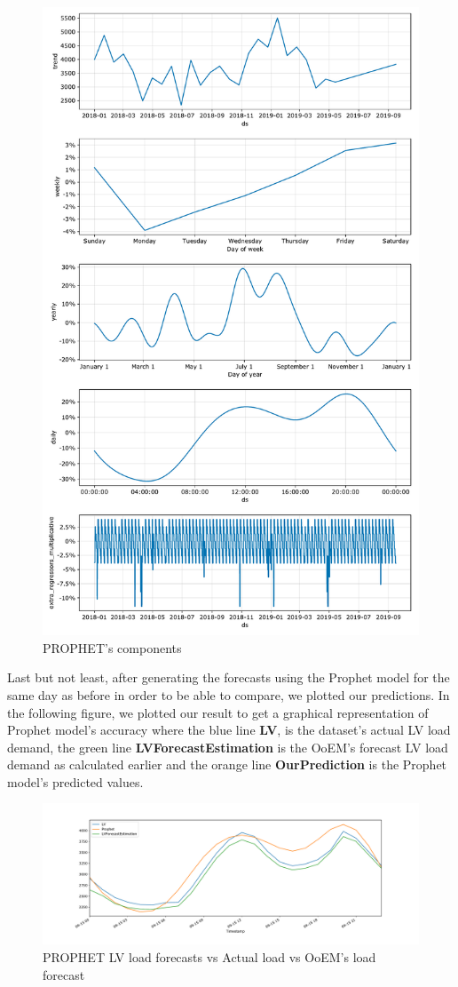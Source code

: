 \begin{figure}[ht!]
\centering
\includegraphics[width=0.7\linewidth]{project/download.pdf}

\caption{PROPHET's components}
\end{figure}
\newpage
Last but not least, after generating the forecasts using the Prophet model for the same day as before in order to be able to compare, we plotted our predictions.
In the following figure, we plotted our result to get a graphical representation of Prophet model's accuracy where the blue line \textbf{LV}, is the dataset's actual LV load demand, the green line \textbf{LVForecastEstimation} is the OoEM's forecast LV load demand as calculated earlier and the orange line \textbf{OurPrediction} is the Prophet model's predicted values. 
\begin{figure}[ht!]
\centering
\includegraphics[width=1\linewidth]{project/prophet2.pdf}
\caption{PROPHET LV load forecasts vs Actual load vs OoEM's load forecast}
\end{figure}
